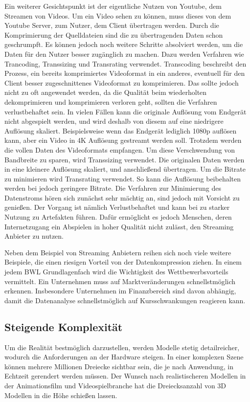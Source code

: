 Ein weiterer Gesichtspunkt ist der eigentliche Nutzen von Youtube, dem Streamen von Videos.
Um ein Video sehen zu können, muss dieses von dem Youtube Server, zum Nutzer, dem Client übertragen werden.
Durch die Komprimierung der Quelldateien sind die zu übertragenden Daten schon geschrumpft.
Es können jedoch noch weitere Schritte absolviert werden, um die Daten für den Nutzer besser zugänglich zu machen.
Dazu werden Verfahren wie Trancoding, Transsizing und Transrating verwendet.
Transcoding beschreibt den Prozess, ein bereits komprimiertes Videoformat in ein anderes, eventuell für den Client besser zugeschnittenes Videoformat zu komprimieren.
Das sollte jedoch nicht zu oft angewendet werden, da die Qualität beim wiederholten dekomprimieren und komprimieren verloren geht, sollten die Verfahren verlustbehaftet sein. \newline
In vielen Fällen kann die originale Auflösung vom Endgerät nicht abgespielt werden, und wird deshalb von diesem auf eine niedrigere Auflösung skaliert.
Beispielsweise wenn das Endgerät lediglich 1080p auflösen kann, aber ein Video in 4K Auflösung gestreamt werden soll.
Trotzdem werden die vollen Daten des Videoformats empfangen.
Um diese Verschwendung von Bandbreite zu sparen, wird Transsizing verwendet.
Die originalen Daten werden in eine kleinere Auflösung skaliert, und anschließend übertragen. \newline
Um die Bitrate zu minimieren wird Transrating verwendet.
So kann die Auflösung beibehalten werden bei jedoch geringere Bitrate.
Die Verfahren zur Minimierung des Datenstroms hören sich zunächst sehr mächtig an, sind jedoch mit Vorsicht zu genießen.
Der Vorgang ist nämlich Verlustbehaftet und kann bei zu starker Nutzung zu Artefakten führen.
Dafür ermöglicht es jedoch Menschen, deren Internetzugang ein Abspielen in hoher Qualität nicht zulässt, den Streaming Anbieter zu nutzen. \newline

Neben dem Beispiel von Streaming Anbietern reihen sich noch viele weitere Beispiele, die einen riesigen Vorteil von der Datenkompression ziehen.
In einem jedem BWL Grundlagenfach wird die Wichtigkeit des Wettbewerbsvorteils vermittelt.
Ein Unternehmen muss auf Marktveränderungen schnellstmöglich erkennen.
Insbesondere Unternehmen im Finanzbereich sind davon abhängig, damit die Datenanalyse schnellstmöglich auf Kursschwankungen reagieren kann.

\subsection{Steigende Komplexität}
\label{subsec:steigende_komplexität}
Um die Realität bestmöglich darzustellen, werden Modelle stetig detailreicher, wodurch die Anforderungen an der Hardware steigen. In einer komplexen Szene können mehrere Millionen Dreiecke sichtbar sein, die je nach Anwendung, in Echtzeit gerendert werden müssen. Der Wunsch nach realistischeren Modellen in der Animationsfilm und Videospielbranche hat die Dreiecksanzahl von 3D Modellen in die Höhe schießen lassen. 

